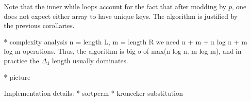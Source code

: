 Note that the inner while loops account for the fact that
after modding by \(p\), one does not expect 
either array to have unique keys.
The algorithm is justified by the previous corollaries.


* complexity analysis
n = length L, m = length R
we need n + m + n log n + m log m operations.
Thus, the algorithm is big o of max(n log n, m log m),
and in practice the \(\Delta_{1}\) length
usually dominates.

* picture

Implementation details: 
* sortperm
* kronecker substitution








